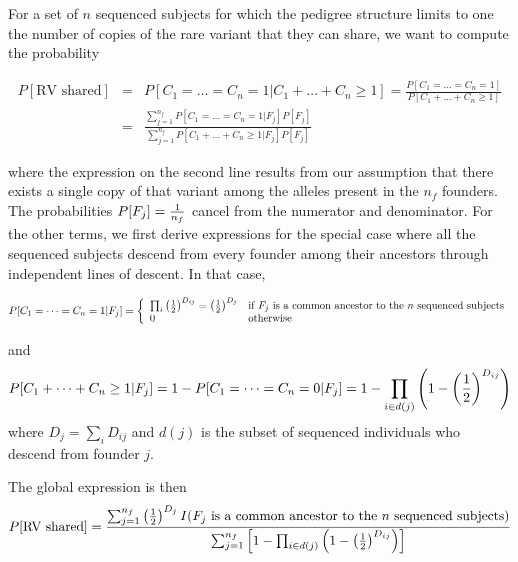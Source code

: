 \documentclass[12pt]{aastex}
\begin{document}
For a set of $n$ sequenced subjects for which the pedigree structure limits to one the number of copies of the rare variant that they can share, we want to compute the probability

\pagebreak

\begin{eqnarray}
P[\mbox{RV shared}] &=& P[C_1 = \dots = C_n = 1 | C_1 + \dots + C_n \geq 1] = \frac{P[C_1 = \dots = C_n = 1 ]}{P[C_1 + \dots + C_n \geq 1]}\\
 &=& \frac{\sum_{j=1}^{n_f} P[C_1 = \dots = C_n = 1 | F_j] P[F_j]}{\sum_{j=1}^{n_f} P[C_1 + \dots + C_n \geq 1 | F_j]P[F_j]} \nonumber
 \label{sharingp}
\end{eqnarray}

where the expression on the second line results from our assumption that there exists a single copy of that variant among the alleles present in the $n_f$ founders. The probabilities $P[F_j] = {1 \over n_f}$ cancel from the numerator and denominator. For the other terms, we first derive expressions for the special case where all the sequenced subjects descend from every founder among their ancestors through independent lines of descent. In that case,

\begin{equation}
P[C_1 = \dots = C_n = 1 | F_j] = \left\{ \begin{array}{ll} \prod_i \left(1 \over 2 \right)^{D_{ij}} = \left(1 \over 2 \right)^{D_j} & \mbox{if $F_j$ is a common ancestor to the $n$ sequenced subjects}\\
                                                          0 & \mbox{otherwise} \end{array} \right.
\label{numerator}
\end{equation}

and 														  
\begin{equation}
P[C_1 + \dots + C_n \geq 1 | F_j] = 1 - P[C_1 = \dots = C_n = 0 | F_j] = 1 - \prod_{i \in d(j)} \left(1 - \left(1 \over 2 \right)^{D_{ij}} \right)
\label{denominator}
\end{equation}
where $D_j = \sum_i D_{ij}$ and $d(j)$ is the subset of sequenced individuals who descend from founder $j$.

The global expression is then
\begin{equation}
P[\mbox{RV shared}] = \frac{\sum_{j=1}^{n_f}  \left(1 \over 2 \right)^{D_j} I(\mbox{$F_j$ is a common ancestor to the $n$ sequenced subjects)}}{\sum_{j=1}^{n_f}  \left[ 1 - \prod_{i \in d(j)} \left(1 - \left(1 \over 2 \right)^{D_{ij}} \right) \right]}
\label{generalform}
\end{equation}
\end{document}
